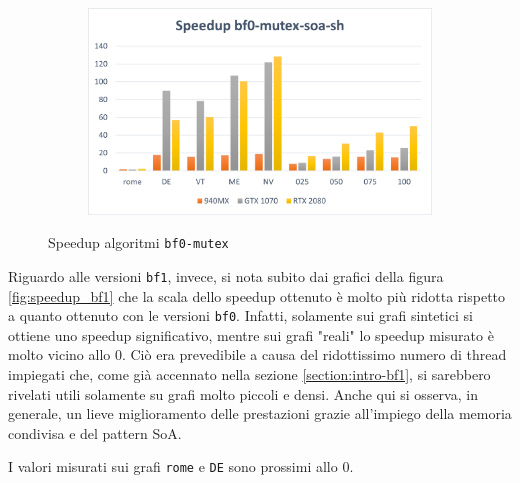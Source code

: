 \documentclass[12pt,a4paper,oneside]{book}
\begin{document}
\begin{figure}[b]
\begin{subfigure}{.5\textwidth}
		\end{subfigure}%
		\begin{subfigure}{.5\textwidth}
			\centering
			\includegraphics[width=\textwidth]{speedup_bf0-mutex-soa-sh}
		\end{subfigure}
		\caption{Speedup algoritmi \texttt{bf0-mutex}}
		\label{fig:speedup_bf0-mutex}
	\end{figure}

	Riguardo alle versioni \texttt{bf1}, invece, si nota subito dai grafici della figura \ref{fig:speedup_bf1} che la scala dello speedup ottenuto è molto più ridotta rispetto a quanto ottenuto con le versioni \texttt{bf0}. Infatti, solamente sui grafi sintetici si ottiene uno speedup significativo, mentre sui grafi "reali" lo speedup misurato è molto vicino allo $0$. Ciò era prevedibile a causa del ridottissimo numero di thread impiegati che, come già accennato nella sezione \ref{section:intro-bf1}, si sarebbero rivelati utili solamente su grafi molto piccoli e densi. Anche qui si osserva, in generale, un lieve miglioramento delle prestazioni grazie all'impiego della memoria condivisa e del pattern SoA.
	
	I valori misurati sui grafi \texttt{rome} e \texttt{DE} sono prossimi allo $0$.
\end{document}
